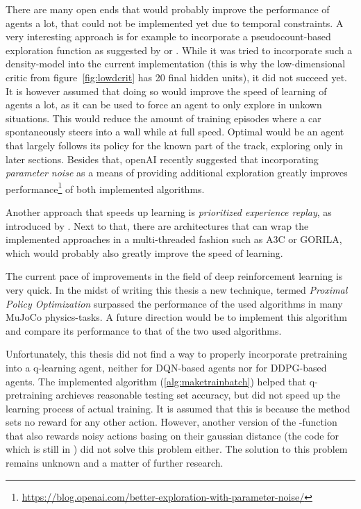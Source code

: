 There are many open ends that would probably improve the performance of agents a lot, that could not be implemented yet due to temporal constraints. A very interesting approach is for example to incorporate a pseudocount-based exploration function as suggested by \cite{ostrovski_count-based_2017} or \cite{martin_count-based_2017}. While it was tried to incorporate such a density-model into the current implementation (this is why the low-dimensional critic from figure~\ref{fig:lowdcrit} has 20 final hidden units), it did not succeed yet. It is however assumed that doing so would improve the speed of learning of agents a lot, as it can be used to force an agent to only explore in unkown situations. This would reduce the amount of training episodes where a car spontaneously steers into a wall while at full speed. Optimal would be an agent that largely follows its policy for the known part of the track, exploring only in later sections. Besides that, openAI recently suggested that incorporating \textit{parameter noise} as a means of providing additional exploration greatly improves performance\footnote{\url{https://blog.openai.com/better-exploration-with-parameter-noise/}} of both implemented algorithms.

Another approach that speeds up learning is \textit{prioritized experience replay}, as introduced by \cite{schaul_prioritized_2015}. Next to that, there are architectures that can wrap the implemented approaches in a multi-threaded fashion such as  A3C\cite{mnih_asynchronous_2016} or GORILA\cite{nair_massively_2015}, which would probably also greatly improve the speed of learning.

The current pace of improvements in the field of deep reinforcement learning is very quick. In the midst of writing this thesis a new technique, termed \textit{Proximal Policy Optimization} \cite{schulman_proximal_2017} surpassed the performance of the used algorithms in many MuJoCo physics-tasks. A future direction would be to implement this algorithm and compare its performance to that of the two used algorithms.

Unfortunately, this thesis did not find a way to properly incorporate pretraining into a q-learning agent, neither for DQN-based agents nor for DDPG-based agents. The implemented algorithm (\ref{alg:maketrainbatch}) helped that q-pretraining archieves reasonable testing set accuracy, but did not speed up the learning process of actual training. It is assumed that this is because the method sets no reward for any other action. However, another version of the -function that also rewards noisy actions basing on their gaussian distance (the code for which is still in ) did not solve this problem either. The solution to this problem remains unknown and a matter of further research.

